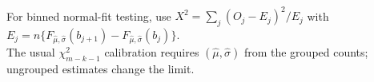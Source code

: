 \begin{remark} \label{rem:grouped-normality-chi-square-caution} \\
For binned normal-fit testing, use $X^2=\sum_j(O_j-E_j)^2/E_j$ with $E_j=n\{F_{\widehat\mu,\widehat\sigma}(b_{j+1})-F_{\widehat\mu,\widehat\sigma}(b_j)\}$.\\
The usual $\chi^2_{m-k-1}$ calibration requires $(\widehat\mu,\widehat\sigma)$ from the grouped counts; ungrouped estimates change the limit.
\end{remark}
